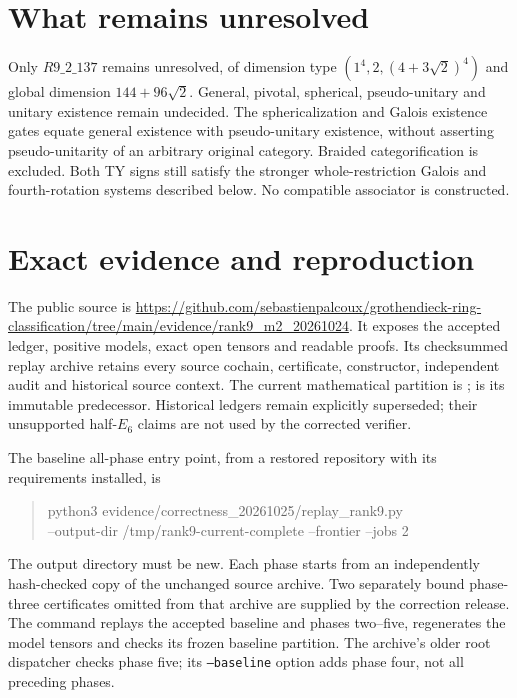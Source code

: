 \documentclass[11pt,a4paper]{article}
\theoremstyle{remark}\newtheorem{remark}[theorem]{Remark}
\begin{document}
{\setlength{\tabcolsep}{3pt}

}




\section{What remains unresolved}

Only $R9\_2\_137$ remains unresolved, of dimension type
$(1^4,2,(4+3\sqrt2)^4)$ and global dimension $144+96\sqrt2$.
General, pivotal, spherical, pseudo-unitary and unitary existence remain
undecided. The sphericalization and Galois existence gates equate general
existence with pseudo-unitary existence, without asserting pseudo-unitarity
of an arbitrary original category. Braided categorification is excluded.
Both TY signs still satisfy the stronger whole-restriction Galois and
fourth-rotation systems described below. No compatible associator is constructed.


\section{Exact evidence and reproduction}\label{sec:replay}
The public source is
\url{https://github.com/sebastienpalcoux/grothendieck-ring-classification/tree/main/evidence/rank9_m2_20261024}.
It exposes the accepted ledger, positive models, exact open tensors and
readable proofs. Its checksummed replay archive retains every source
cochain, certificate, constructor, independent audit and historical source
context. The current mathematical partition is ;  is its immutable predecessor.
Historical ledgers remain explicitly superseded; their unsupported half-$E_6$
claims are not used by the corrected verifier.

The baseline all-phase entry point, from a restored repository with its
requirements installed, is
\begin{quote}\small\ttfamily
python3 evidence/correctness\_20261025/replay\_rank9.py \\
\quad --output-dir /tmp/rank9-current-complete --frontier --jobs 2
\end{quote}
The output directory must be new. Each phase starts from an independently
hash-checked copy of the unchanged source archive. Two separately bound
phase-three certificates omitted from that archive are supplied by the
correction release. The command replays the accepted baseline and phases
two--five, regenerates the model tensors and checks its frozen baseline partition.
The archive's older root dispatcher checks phase five; its
\texttt{--baseline} option adds phase four, not all preceding phases.
\end{document}

